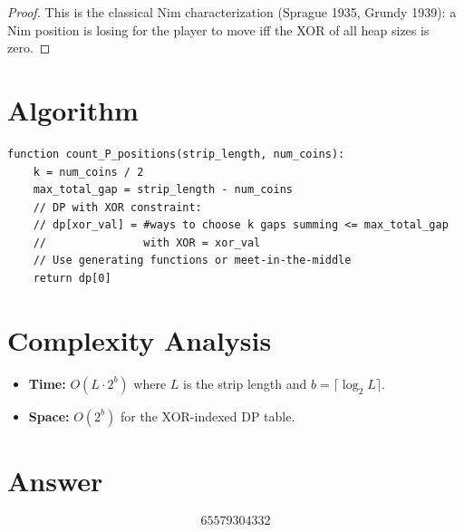 \documentclass[a4paper,12pt]{article}
\begin{document}
\begin{proof}
This is the classical Nim characterization (Sprague 1935, Grundy 1939): a Nim position is losing for the player to move iff the XOR of all heap sizes is zero.
\end{proof}

\section{Algorithm}

\begin{verbatim}
function count_P_positions(strip_length, num_coins):
    k = num_coins / 2
    max_total_gap = strip_length - num_coins
    // DP with XOR constraint:
    // dp[xor_val] = #ways to choose k gaps summing <= max_total_gap
    //               with XOR = xor_val
    // Use generating functions or meet-in-the-middle
    return dp[0]
\end{verbatim}

\section{Complexity Analysis}
\begin{itemize}
    \item \textbf{Time:} $O(L \cdot 2^b)$ where $L$ is the strip length and $b = \lceil \log_2 L \rceil$.
    \item \textbf{Space:} $O(2^b)$ for the XOR-indexed DP table.
\end{itemize}

\section{Answer}

\[
\boxed{65579304332}
\]
\end{document}
